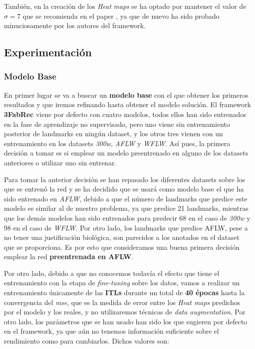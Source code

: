         \medskip

        \noindent También, en la creación de los \textit{Heat maps} se ha optado por mantener el valor de $\sigma =7$ que se recomienda en el paper \cite{browatzki20203fabrec}, ya que de nuevo ha sido probado minuciosamente por los autores del framework.
    
    \subsection{Experimentación}
        \subsubsection{Modelo Base}
            \noindent En primer lugar se va a buscar un \textbf{modelo base} con el que obtener los primeros resultados y que iremos refinando hasta obtener el modelo solución. El framework \textbf{3FabRec} viene por defecto con cuatro modelos, todos ellos han sido entrenados en la fase de aprendizaje no supervisado, pero uno viene sin entrenamiento posterior de landmarks en ningún dataset, y los otros tres vienen con un entrenamiento en los datasets \textit{300w}, \textit{AFLW} y \textit{WFLW}. Así pues, la primera decisión a tomar es si emplear un modelo preentrenado en alguno de los datasets anteriores o utilizar uno sin entrenar. 

            \medskip

            \noindent Para tomar la anterior decisión se han repasado los diferentes datasets sobre los que se entrenó la red y se ha decidido que se usará como modelo base el que ha sido entrenado en \textit{AFLW}, debido a que el número de landmarks que predice este modelo es similar al de nuestro problema, ya que predice 21 landmarks, mientras que los demás modelos han sido entrenados para predecir 68 en el caso de \textit{300w} y 98 en el caso de \textit{WFLW}. Por otro lado, los landmarks que predice AFLW, pese a no tener una justificación biológica, son parecidos a los anotados en el dataset que se proporciona. Es por esto que consideramos una buena primera decisión emplear la red \textbf{preentrenada en AFLW}.


            \medskip

            \noindent Por otro lado, debido a que no conocemos todavía el efecto que tiene el entrenamiento con la etapa de \textit{fine-tuning} sobre los datos, vamos a realizar un entrenamiento únicamente de las \textbf{ITLs} durante un total de \textbf{40 épocas} hasta la convergencia del \textit{mse}, que es la medida de error entre los \textit{Heat maps} predichos por el modelo y los reales, y no utilizaremos técnicas de \textit{data augmentation}. Por otro lado, los parámetros que se han usado han sido los que sugieren por defecto en el framework, ya que aún no tenemos información suficiente sobre el rendimiento como para cambiarlos. Dichos valores son: 

